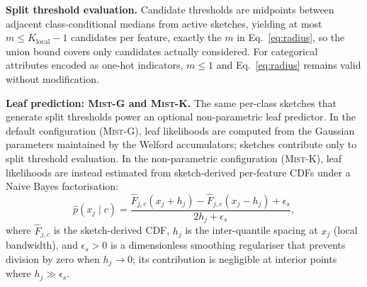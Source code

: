 \documentclass{article}
\newcommand{\mist}{\textsc{Mist}}
\begin{document}
\noindent
\textbf{Split threshold evaluation.}
Candidate thresholds are midpoints between adjacent class-conditional
medians from active sketches, yielding at most $m \leq K_{\mathrm{local}}-1$
candidates per feature, exactly the $m$ in Eq.~\eqref{eq:radius}, so the
union bound covers only candidates actually considered. For categorical
attributes encoded as one-hot indicators, $m \leq 1$ and
Eq.~\eqref{eq:radius} remains valid without modification.

\noindent
\textbf{Leaf prediction: \mist{}-G and \mist{}-K.}
The same per-class sketches that generate split thresholds power an
optional non-parametric leaf predictor. In the default configuration
(\mist{}-G), leaf likelihoods are computed from the Gaussian parameters
maintained by the Welford accumulators; sketches contribute only to
split threshold evaluation. In the non-parametric configuration
(\mist{}-K), leaf likelihoods are instead estimated from sketch-derived
per-feature CDFs under a Naive Bayes factorisation:
\begin{equation}
  \hat{p}(x_j \mid c)
  = \frac{\widehat{F}_{j,c}(x_j + h_j)
          - \widehat{F}_{j,c}(x_j - h_j) + \epsilon_s}
         {2h_j + \epsilon_s},
  \label{eq:mistk-likelihood}
\end{equation}
where $\widehat{F}_{j,c}$ is the sketch-derived CDF, $h_j$ is the
inter-quantile spacing at $x_j$ (local bandwidth), and $\epsilon_s > 0$
is a dimensionless smoothing regulariser that prevents division by zero
when $h_j \to 0$; its contribution is negligible at interior points
where $h_j \gg \epsilon_s$.
\end{document}
